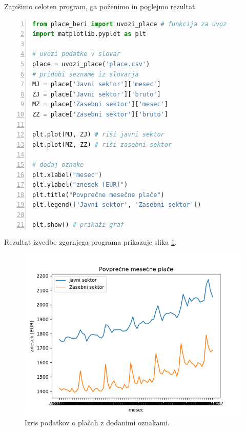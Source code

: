 Zapišimo celoten program, ga poženimo in poglejmo rezultat. 
\begin{lstlisting}[language=Python,numbers=left]
from place_beri import uvozi_place # funkcija za uvoz
import matplotlib.pyplot as plt

# uvozi podatke v slovar
place = uvozi_place('place.csv')
# pridobi sezname iz slovarja
MJ = place['Javni sektor']['mesec']
ZJ = place['Javni sektor']['bruto']
MZ = place['Zasebni sektor']['mesec']
ZZ = place['Zasebni sektor']['bruto']

plt.plot(MJ, ZJ) # riši javni sektor
plt.plot(MZ, ZZ) # riši zasebni sektor

# dodaj oznake
plt.xlabel("mesec")
plt.ylabel("znesek [EUR]")
plt.title("Povprečne mesečne plače")
plt.legend(['Javni sektor', 'Zasebni sektor'])

plt.show() # prikaži graf
\end{lstlisting}
Rezultat izvedbe zgornjega programa prikazuje slika \ref{img:plt4}.
\begin{figure}
    \includegraphics[width=\linewidth]{img/plt4.png}
    \caption{Izris podatkov o plačah z dodanimi oznakami.}
    \label{img:plt4}
\end{figure}

